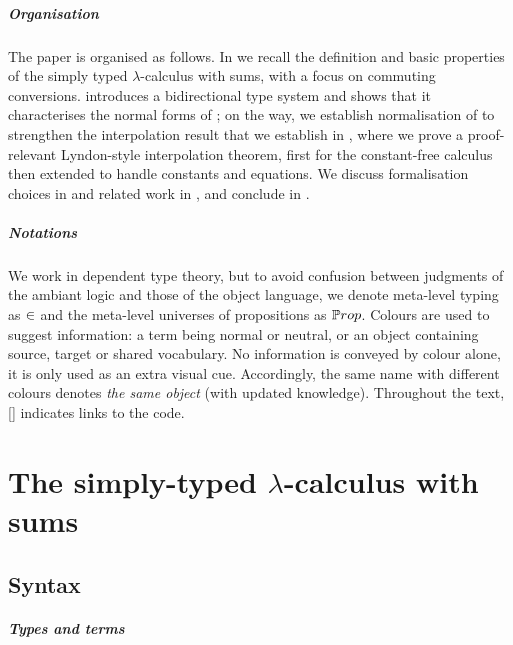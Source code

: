 \documentclass[a4paper,UKenglish,cleveref, autoref, thm-restate]{lipics-v2021}
\begin{document}
\subparagraph*{Organisation}
The paper is organised as follows.
In  we recall the definition and basic properties of the simply typed  \(\lambda\)-calculus with sums, with a focus on commuting conversions.
 introduces a bidirectional type system and shows that it characterises the normal forms of \stlcp; on the way, we establish normalisation of \stlcp to strengthen the interpolation result that we establish in , where we prove a proof-relevant Lyndon-style interpolation theorem, first for the constant-free calculus
then extended to handle constants and equations.
We discuss formalisation choices in  and related work in 
, and conclude in .

\subparagraph*{Notations} We work in dependent type theory, but
to avoid confusion between judgments of the ambiant logic and those of
the object language,
we denote meta-level typing as \(\in\) and the meta-level universes
of propositions as \(\Prop\).
%
Colours are used to suggest information:
a term being \textcolor{ccol}{normal} or \textcolor{icol}{neutral},
or an object containing \textcolor{scol}{source},
\textcolor{tcol}{target} or \textcolor{mcol}{shared} vocabulary.
No information is conveyed by colour alone, it is only used as an extra visual
cue. Accordingly, the same name with different colours denotes
\emph{the same object} (with updated knowledge).
Throughout the text, \formfile[]{}[] indicates links to the code.

\section{The simply-typed \(\lambda\)-calculus with sums}
\label{sec:stlc-sums}

\subsection{Syntax}

\subparagraph*{Types and terms}
\end{document}
